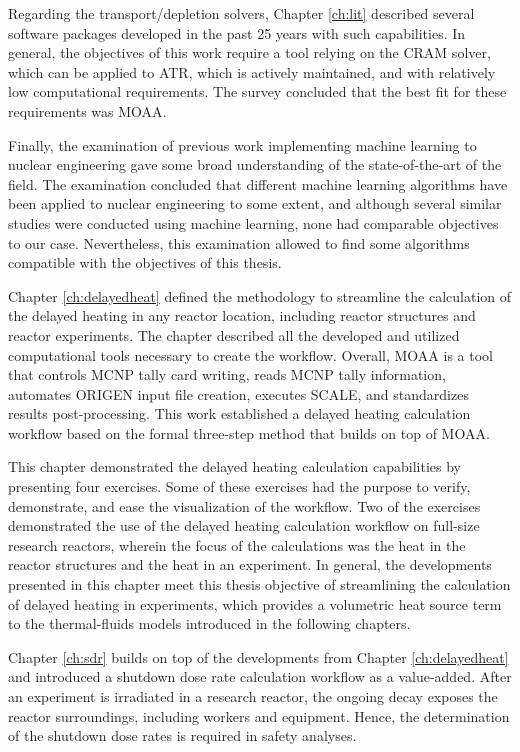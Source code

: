 Regarding the transport/depletion solvers, Chapter \ref{ch:lit} described several software packages developed in the past 25 years with such capabilities.
In general, the objectives of this work require a tool relying on the CRAM solver, which can be applied to ATR, which is actively maintained, and with relatively low computational requirements.
The survey concluded that the best fit for these requirements was MOAA.

Finally, the examination of previous work implementing machine learning to nuclear engineering gave some broad understanding of the state-of-the-art of the field.
The examination concluded that different machine learning algorithms have been applied to nuclear engineering to some extent, and although several similar studies were conducted using machine learning, none had comparable objectives to our case.
Nevertheless, this examination allowed to find some algorithms compatible with the objectives of this thesis.


Chapter \ref{ch:delayedheat} defined the methodology to streamline the calculation of the delayed heating in any reactor location, including reactor structures and reactor experiments.
The chapter described all the developed and utilized computational tools necessary to create the workflow.
Overall, MOAA is a tool that controls MCNP tally card writing, reads MCNP tally information, automates ORIGEN input file creation, executes SCALE, and standardizes results post-processing.
This work established a delayed heating calculation workflow based on the formal three-step method that builds on top of MOAA.

This chapter demonstrated the delayed heating calculation capabilities by presenting four exercises.
Some of these exercises had the purpose to verify, demonstrate, and ease the visualization of the workflow.
Two of the exercises demonstrated the use of the delayed heating calculation workflow on full-size research reactors, wherein the focus of the calculations was the heat in the reactor structures and the heat in an experiment.
In general, the developments presented in this chapter meet this thesis objective of streamlining the calculation of delayed heating in experiments, which provides a volumetric heat source term to the thermal-fluids models introduced in the following chapters.


Chapter \ref{ch:sdr} builds on top of the developments from Chapter \ref{ch:delayedheat} and introduced a shutdown dose rate calculation workflow as a value-added.
After an experiment is irradiated in a research reactor, the ongoing decay exposes the reactor surroundings, including workers and equipment.
Hence, the determination of the shutdown dose rates is required in safety analyses.

